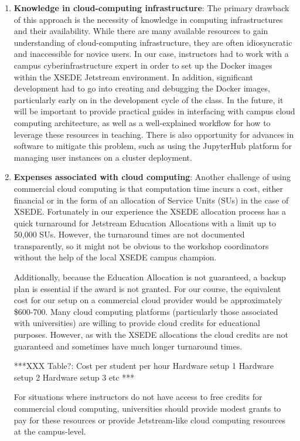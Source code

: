 \begin{enumerate}

\item {\bf Knowledge in cloud-computing infrastructure}: The primary drawback of
this approach is the necessity of knowledge in computing infrastructures and
their availability. While there are many available resources to gain
understanding of cloud-computing infrastructure, they are often idiosyncratic and
inaccessible for novice users. In our case, instructors had to work with a
campus cyberinfrastructure expert in order to set up the Docker images within
the XSEDE Jetstream environment. In addition, significant development had to go
into creating and debugging the Docker images, particularly early on in the
development cycle of the class. In the future, it will be important to provide
practical guides in interfacing with campus cloud computing architecture, as
well as a well-explained workflow for how to leverage these resources in
teaching. There is also opportunity for advances in software to mitigate this
problem, such as using the JupyterHub \cite{XXXJUPYTERHUBREFERENCE} platform
for managing user instances on a cluster deployment.

\item {\bf Expenses associated with cloud computing}: Another challenge of using
commercial cloud computing is that computation time incurs a cost, either
financial or in the form of an allocation of Service Units (SUs) in the case of
XSEDE. Fortunately in our experience the XSEDE allocation process has a quick
turnaround for Jetstream Education Allocations with a limit up to 50,000 SUs.
However, the turnaround times are not documented transparently, so it might not
be obvious to the workshop coordinators without the help of the local XSEDE campus
champion.

Additionally, because the Education Allocation is not guaranteed, a backup plan
is essential if the award is not granted. For our course, the equivalent cost
for our setup on a commercial cloud provider would be approximately \$600-700.
Many cloud computing platforms (particularly those associated with universities)
are willing to provide cloud credits for educational purposes. However, as with
the XSEDE allocations the cloud credits are not guaranteed and sometimes have
much longer turnaround times.

***XXX
Table?:
                    Cost per student per hour
Hardware setup 1
Hardware setup 2
Hardware setup 3
etc
***

For situations where instructors do not have access to free credits for
commercial cloud computing, universities should provide modest grants to pay for
these resources or provide Jetstream-like cloud computing resources at the
campus-level.


\end{enumerate}
